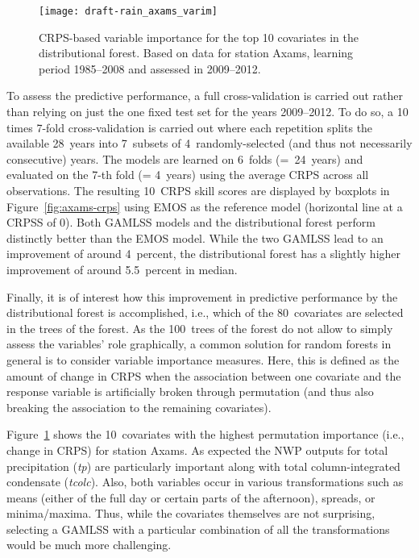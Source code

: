 \documentclass[aoas, preprint]{imsart}
\numberwithin{equation}{subsection}
\begin{document}
\begin{figure}[t!]
\centering
{}
\texttt{[image: draft-rain\_axams\_varim]}
\caption{\label{fig:axams-varimp} CRPS-based variable importance for the top 10 covariates 
in the distributional forest. Based on data for station Axams, learning period 
1985--2008 and assessed in 2009--2012.}
\end{figure}

To assess the predictive performance, a full cross-validation is carried out
rather than relying on just the one fixed test set for the years 2009--2012.
To do so, a 10 times 7-fold cross-validation is carried out where each repetition
splits the available 28~years into 7~subsets of 4~randomly-selected 
(and thus not necessarily consecutive) years.
The models are learned on 6~folds (=~24~years) and evaluated on the 7-th fold
(= 4~years) using the average CRPS across all observations.
The resulting 10~CRPS skill scores are displayed by boxplots in
Figure~\ref{fig:axams-crps} using EMOS as the reference model (horizontal
line at a CRPSS of 0). Both GAMLSS models and the distributional forest 
perform distinctly better than the EMOS model. While the two GAMLSS lead to an improvement 
of around 4~percent, the distributional forest has a slightly higher improvement
of around 5.5~percent in median.

Finally, it is of interest how this improvement in predictive performance
by the distributional forest is accomplished, i.e., which of the 80~covariates
are selected in the trees of the forest. As the 100~trees of the forest
do not allow to simply assess the variables' role graphically, a common
solution for random forests in general is to consider variable importance
measures. Here, this is defined as the amount of change in CRPS when
the association between one covariate and the response variable is
artificially broken through permutation (and thus also breaking the
association to the remaining covariates).

Figure~\ref{fig:axams-varimp} shows the 10~covariates with the highest permutation
importance (i.e., change in CRPS) for station Axams. As expected the NWP outputs
for total precipitation (\emph{tp}) are particularly important along with total
column-integrated condensate (\emph{tcolc}). Also, both variables occur
in various transformations such as means (either of the full day or certain parts
of the afternoon), spreads, or minima/maxima. Thus, while the covariates
themselves are not surprising, selecting a GAMLSS with a particular combination
of all the transformations would be much more challenging.
\end{document}
